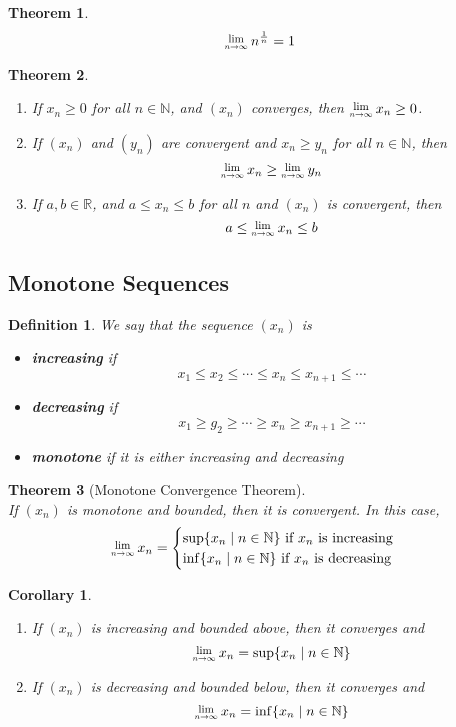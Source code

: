 \documentclass[12pt]{article}
\newcommand{\Lim}[1]{\raisebox{0.5ex}{\scalebox{0.8}{$\displaystyle \lim_{#1}\;$}}}
\newtheorem{definition}{Definition}[section]
\newtheorem{theorem}{Theorem}[section]
\newtheorem{corollary}{Corollary}[section]
\theoremstyle{definition}
\begin{document}
\begin{theorem}
\[
\Lim{n\to\infty}n^\frac{1}{n}=1
\]
\end{theorem}
\begin{theorem}
\normalfont
\begin{enumerate}
\item If $x_n\geq 0$ for all $n\in\mathbb{N}$, and $(x_n)$ converges, then $\Lim{n\to\infty}x_n\geq 0$.
\item If $(x_n)$ and $(y_n)$ are convergent and $x_n\geq y_n$ for all $n\in\mathbb{N}$, then
\[
\Lim{n\to\infty} x_n\geq \Lim{n\to\infty}y_n
\]
\item If $a,b\in\mathbb{R}$, and $a\leq x_n\leq b$ for all $n$ and $(x_n)$ is convergent, then
\[
a\leq \Lim{n\to\infty}x_n\leq b
\]
\end{enumerate}
\end{theorem}
\subsection{Monotone Sequences}
\begin{definition}\normalfont We say that the sequence $(x_n)$ is
\begin{itemize}
\item \textbf{increasing} if
\[
x_1\leq x_2\leq\cdots\leq x_n\leq x_{n+1}\leq \cdots
\]
\item \textbf{decreasing} if
\[
x_1\geq g_2\geq\cdots\geq x_n\geq x_{n+1}\geq \cdots
\]
\item \textbf{monotone} if it is either increasing and decreasing
\end{itemize}
\end{definition}
\begin{theorem}[Monotone Convergence Theorem]
\hfill\\\normalfont If $(x_n)$ is monotone and bounded, then it is convergent. In this case,
\[
\Lim{n\to\infty}x_n = 
\begin{cases}
\sup\{x_n\mid n\in\mathbb{N}\}\text{ if }x_n\text{ is increasing}\\
\inf\{x_n\mid n\in\mathbb{N}\}\text{ if }x_n\text{ is decreasing}
\end{cases}
\]
\end{theorem}
\begin{corollary}
\begin{enumerate}
\item If $(x_n)$ is increasing and bounded above, then it converges and 
\[
\Lim{n\to\infty}x_n = \sup\{x_n\mid n\in\mathbb{N}\}
\]
\item If $(x_n)$ is decreasing and bounded below, then it converges and 
\[
\Lim{n\to\infty}x_n = \inf\{x_n\mid n\in\mathbb{N}\}
\]
\end{enumerate}
\end{corollary}
\end{document}
